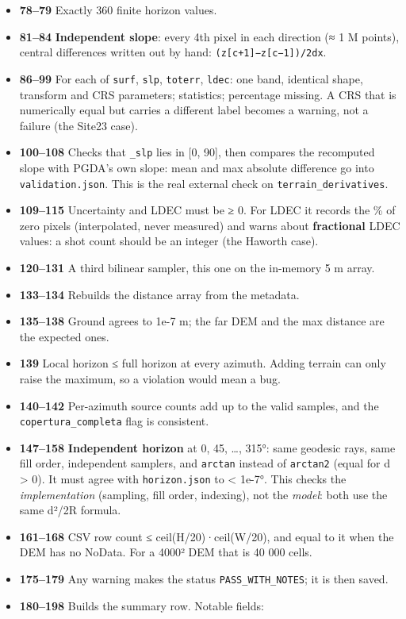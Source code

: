 \documentclass[11pt,a4paper]{article}
\begin{document}
\begin{itemize}
  Line 73 is why the existing results, which have no
  \texttt{site} key, cannot pass
  \texttt{verify} today.
\item
  \textbf{78--79} Exactly 360 finite horizon values.
\item
  \textbf{81--84} \textbf{Independent slope}: every 4th pixel in each
  direction (≈ 1 M points), central differences written out by hand:
  \texttt{(z[c+1]−z[c−1])/2dx}.
\item
  \textbf{86--99} For each of \texttt{surf},
  \texttt{slp}, \texttt{toterr},
  \texttt{ldec}: one band, identical shape, transform
  and CRS parameters; statistics; percentage missing. A CRS that is
  numerically equal but carries a different label becomes a warning, not
  a failure (the Site23 case).
\item
  \textbf{100--108} Checks that \texttt{\_slp} lies in
  {[}0, 90{]}, then compares the recomputed slope with PGDA's own slope:
  mean and max absolute difference go into
  \texttt{validation.json}. This is the real external
  check on \texttt{terrain\_derivatives}.
\item
  \textbf{109--115} Uncertainty and LDEC must be ≥ 0. For LDEC it
  records the \% of zero pixels (interpolated, never measured) and warns
  about \textbf{fractional} LDEC values: a shot count should be an
  integer (the Haworth case).
\item
  \textbf{120--131} A third bilinear sampler, this one on the in-memory
  5 m array.
\item
  \textbf{133--134} Rebuilds the distance array from the metadata.
\item
  \textbf{135--138} Ground agrees to 1e-7 m; the far DEM and the max
  distance are the expected ones.
\item
  \textbf{139} Local horizon ≤ full horizon at every azimuth. Adding
  terrain can only raise the maximum, so a violation would mean a bug.
\item
  \textbf{140--142} Per-azimuth source counts add up to the valid
  samples, and the \texttt{copertura\_completa} flag is
  consistent.
\item
  \textbf{147--158} \textbf{Independent horizon} at 0, 45, \ldots, 315°:
  same geodesic rays, same fill order, independent samplers, and
  \texttt{arctan} instead of
  \texttt{arctan2} (equal for d \textgreater{} 0). It
  must agree with \texttt{horizon.json} to \textless{}
  1e-7°. This checks the \emph{implementation} (sampling, fill order,
  indexing), not the \emph{model}: both use the same d²/2R formula.
\item
  \textbf{161--168} CSV row count ≤ ceil(H/20)·ceil(W/20), and equal to
  it when the DEM has no NoData. For a 4000² DEM that is 40 000 cells.
\item
  \textbf{175--179} Any warning makes the status
  \texttt{PASS\_WITH\_NOTES}; it is then saved.
\item
  \textbf{180--198} Builds the summary row. Notable fields:


\end{itemize}
\end{document}
